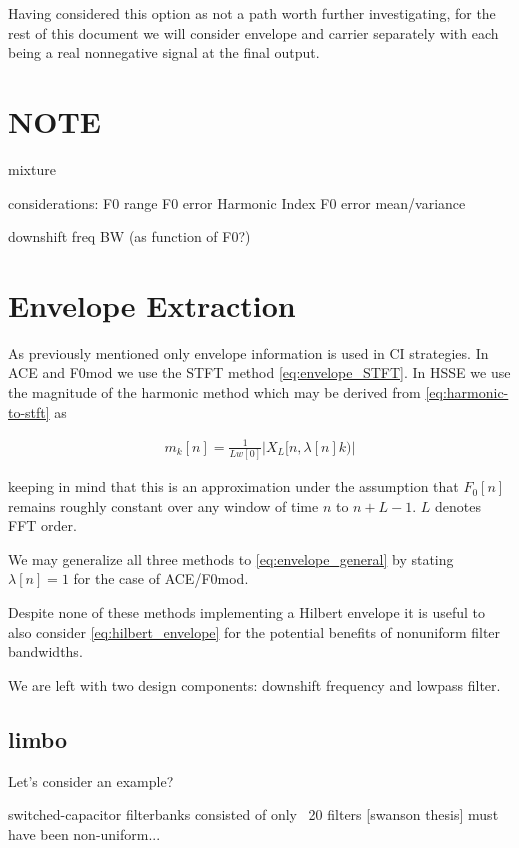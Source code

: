 \documentclass [11pt, proquest] {uwthesis}[2015/03/03]
\begin{document}
Having considered this option as not a path worth further investigating, for the rest of this document we will consider envelope and carrier separately with each being a real nonnegative signal at the final output.

\section{NOTE}

mixture %

considerations:
F0 range
F0 error
Harmonic Index
F0 error mean/variance

downshift freq
BW (as function of F0?)


\section{Envelope Extraction}

As previously mentioned only envelope information is used in CI strategies.  In ACE and F0mod we use the STFT method \ref{eq:envelope_STFT}.  In HSSE we use the magnitude of the harmonic method which may be derived from \ref{eq:harmonic-to-stft} as 

\begin{align}
\label{eq:envelope_general}
m_k[n] = \frac{1}{Lw[0]} \vert X_L[n, \lambda[n]k) \vert
\end{align}

keeping in mind that this is an approximation under the assumption that $F_0[n]$ remains roughly constant over any window of time $n$ to $n + L - 1$.  $L$ denotes FFT order.

We may generalize all three methods to \ref{eq:envelope_general} by stating $\lambda[n] = 1$ for the case of ACE/F0mod.

Despite none of these methods implementing a Hilbert envelope it is useful to also consider \ref{eq:hilbert_envelope} for the potential benefits of nonuniform filter bandwidths.

We are left with two design components: downshift frequency and lowpass filter.

\subsection{limbo}

Let's consider an example?

switched-capacitor filterbanks consisted of only ~20 filters [swanson thesis] must have been non-uniform...
\end{document}
